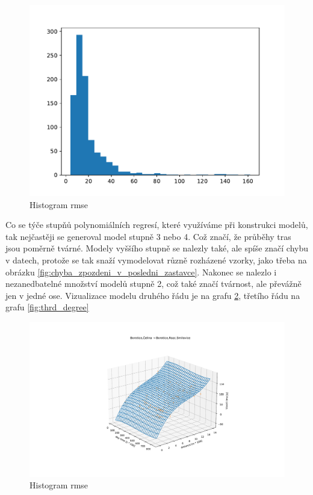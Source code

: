 \begin{figure}
   \centering
 \includegraphics[width=0.4\linewidth]{../img/rmse}
 \caption{Histogram \gls{rmse}}
 \label{fig:rmse}
\end{figure}


\bigbreak


Co se týče stupňů polynomiálních regresí, které využíváme při konstrukci modelů, tak nejčastěji se generoval model stupně 3 nebo 4. Což značí, že průběhy tras jsou poměrně tvárné. Modely vyššího stupně se nalezly také, ale spíše značí chybu v datech, protože se tak snaží vymodelovat různě rozházené vzorky, jako třeba na obrázku \ref{fig:chyba_zpozdeni_v_posledni_zastavce}. Nakonec se nalezlo i nezanedbatelné množství modelů stupně 2, což také značí tvárnost, ale převážně jen v jedné ose. Vizualizace modelu druhého řádu je na grafu \ref{fig:second_degree}, třetího řádu na grafu \ref{fig:thrd_degree}




\begin{figure}
   \centering
 \includegraphics[width=1\linewidth]{../img/second_degree}
 \caption{Histogram \gls{rmse}}
 \label{fig:second_degree}
\end{figure}




